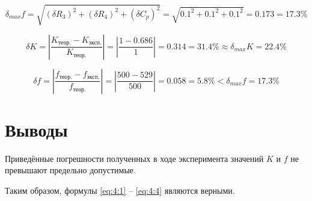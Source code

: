 \begin{displaymath}
	\delta_{max} f = \sqrt{(\delta R_3)^2 + (\delta R_4)^2 + (\delta C_p)^2} =  \sqrt{0.1^2 + 0.1^2 + 0.1^2} = 0.173 = 17.3 \%
\end{displaymath}

\begin{displaymath}
	\delta K = \left|\frac{K_\text{теор.} - K_\text{эксп.}}{K_\text{теор.}} \right| = \left|\frac{1 - 0.686}{1}\right| = 0.314 = 31.4\% \approx \delta_{max} K = 22.4\%
\end{displaymath}

\begin{displaymath}
	\delta f = \left|\frac{f_\text{теор.} - f_\text{эксп.}}{f_\text{теор.}} \right| = \left|\frac{500 - 529}{500}\right| = 0.058 = 5.8\% < \delta_{max} f = 17.3\%
\end{displaymath}

\section{Выводы}

Приведённые погрешности полученных в ходе эксперимента значений $K$ и $f$ не превышают предельно допустимые.

Таким образом, формулы \ref{eq:4:1} -- \ref{eq:4:4} являются верными.

